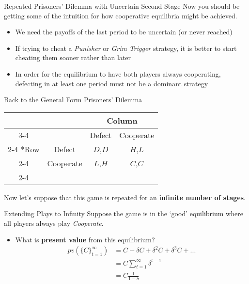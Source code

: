 \begin{frame}{Repeated Prisoners' Dilemma with Uncertain Second Stage}
  Now you should be getting some of the intuition for how cooperative equilibria might be achieved.
  \begin{itemize}
    \item We need the payoffs of the last period to be uncertain (or never reached)
    \item If trying to cheat a \textit{Punisher} or \textit{Grim Trigger} strategy, 
    it is better to start cheating them sooner rather than later
    \item In order for the equilibrium to have both players always cooperating,
    defecting in at least one period must not be a dominant strategy
  \end{itemize}
\end{frame}

\begin{frame}{Back to the General Form Prisoners' Dilemma}
  \begin{table}[!h]
    \centering
    \begin{tabular}{*{4}{c|}}
      \multicolumn{2}{c}{} & \multicolumn{2}{c}{Column} \\ \cline{3-4}
      \multicolumn{1}{c}{} &         & Defect  & Cooperate \\ \cline{2-4}
      \multirow{2}*{Row} &    Defect & $D$,$D$ & $H$,$L$   \\ \cline{2-4}
                         & Cooperate & $L$,$H$ & $C$,$C$   \\ \cline{2-4} 
    \end{tabular} 
  \end{table} 
  Now let's suppose that this game is repeated for an \textbf{infinite number of stages}.
\end{frame}

\begin{frame}{Extending Plays to Infinity}
  Suppose the game is in the `good' equilibrium where all players always play \textit{Cooperate}.
  \begin{itemize}
    \item What is \textbf{present value} from this equilibrium? 
    \begin{align*}
      pv\left(\{ C \}_{t=1}^{\infty}\right) & = C + \delta C + \delta^2 C + \delta^3 C + ... \\ 
         & = C \sum_{t=1}^{\infty} \delta^{t-1} \\
         & = C \frac{1}{1-\delta}
    \end{align*}
  \end{itemize}
\end{frame}

